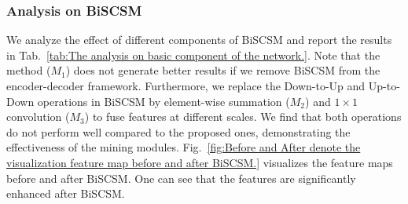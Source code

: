 \documentclass[letterpaper]{article} %
\begin{document}
\subsubsection{Analysis on BiSCSM}
We analyze the effect of different components of BiSCSM and report the results in Tab.~\ref{tab:The analysis on basic component of the network.}.
Note that the method ($M_{1}$) does not generate better results if we remove BiSCSM from the encoder-decoder framework.
Furthermore, we replace the Down-to-Up and Up-to-Down operations in BiSCSM by element-wise summation ($M_{2}$) and $1 \times 1$ convolution ($M_{3}$) to fuse features at different scales.
We find that both operations do not perform well compared to the proposed ones, demonstrating the effectiveness of the mining modules.
Fig.~\ref{fig:Before and After denote the visualization feature map before and after BiSCSM.}
visualizes the feature maps before and after BiSCSM.
One can see that the features are significantly enhanced after BiSCSM. %
\begin{table}[!t]%
{}
\caption{Ablation study of BiSCSM.
		\CheckmarkBold and \XSolidBrush denote that the corresponding component is adopted and not adopted, respectively.}
\label{tab:The analysis on basic component of the network.}
\end{table}
\end{document}
